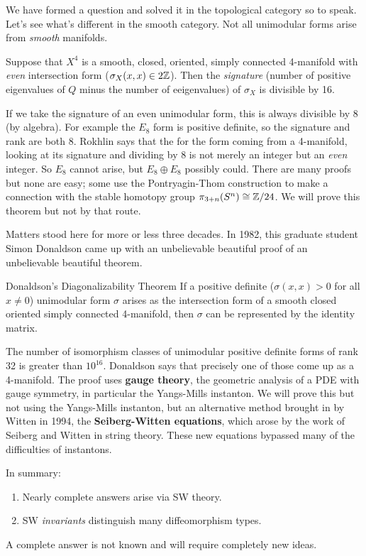 We have formed a question and solved it in the topological category so to speak. Let's see what's different in the smooth category. Not all unimodular forms arise from \emph{smooth} manifolds.
\begin{theorem}[Rokhlin, 1952]
    Suppose that $X^4$ is a smooth, closed, oriented, simply connected 4-manifold with \emph{even} intersection form ($\sigma_X (x,x) \in 2\mathbb{Z}$). Then the \emph{signature} (number of positive eigenvalues of $Q$ minus the number of eeigenvalues) of $\sigma_X$ is divisible by 16. 
\end{theorem}
If we take the signature of an even unimodular form, this is always divisible by 8 (by algebra). For example the $E_8$ form is positive definite, so the signature and rank are both 8. Rokhlin says that the for the form coming from a 4-manifold, looking at its signature and dividing by 8 is not merely an integer but an \emph{even} integer. So $E_8$ cannot arise, but $E_8\oplus E_8$ possibly could. There are many proofs but none are easy; some use the Pontryagin-Thom construction to make a connection with the stable homotopy group $\pi_{3+n}(S^n ) \cong \mathbb{Z} /24$. We will prove this theorem but not by that route.

Matters stood here for more or less three decades. In 1982, this graduate student Simon Donaldson came up with an unbelievable beautiful proof of an unbelievable beautiful theorem.
\begin{namedthm}{Donaldson's Diagonalizability Theorem} 
    If a positive definite ($\sigma(x,x) > 0$ for all $x \neq 0$) unimodular form $\sigma$ arises as the intersection form of a smooth closed oriented simply connected 4-manifold, then $\sigma$ can be represented by the identity matrix.
\end{namedthm}
The number of isomorphism classes of unimodular positive definite forms of rank 32 is greater than $10 ^{16}$. Donaldson says that precisely one of those come up as a 4-manifold. The proof uses \textbf{gauge theory}, the geometric analysis of a PDE with gauge symmetry, in particular the Yangs-Mills instanton. We will prove this but not using the Yangs-Mills instanton, but an alternative method brought in by Witten in 1994, the \textbf{Seiberg-Witten equations}, which arose by the work of Seiberg and Witten in string theory.
These new equations bypassed many of the difficulties of instantons.

In summary:
\begin{enumerate}[label=(\roman*)]
\setlength\itemsep{-.2em}
    \item Nearly complete answers arise via SW theory.
    \item SW \emph{invariants} distinguish many diffeomorphism types.
\end{enumerate}
A complete answer is not known and will require completely new ideas.

